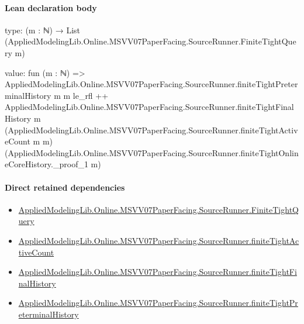 \documentclass[10pt]{article}
\begin{document}
\paragraph{Lean declaration body}
\begin{ReviewVerbatim}
type:
(m : ℕ) → List (AppliedModelingLib.Online.MSVV07PaperFacing.SourceRunner.FiniteTightQuery m)

value:
fun (m : ℕ) =>
  AppliedModelingLib.Online.MSVV07PaperFacing.SourceRunner.finiteTightPreterminalHistory m m le_rfl ++
    AppliedModelingLib.Online.MSVV07PaperFacing.SourceRunner.finiteTightFinalHistory m
      (AppliedModelingLib.Online.MSVV07PaperFacing.SourceRunner.finiteTightActiveCount m m)
      (AppliedModelingLib.Online.MSVV07PaperFacing.SourceRunner.finiteTightOnlineCoreHistory._proof_1 m)
\end{ReviewVerbatim}

\paragraph{Direct retained dependencies}
\begin{itemize}\raggedright
\item \hyperlink{governing-declaration-feae64ffc2ccaca7}{Applied\allowbreak{}Modeling\allowbreak{}Lib.\allowbreak{}Online.\allowbreak{}MSVV07\allowbreak{}Paper\allowbreak{}Facing.\allowbreak{}Source\allowbreak{}Runner.\allowbreak{}Finite\allowbreak{}Tight\allowbreak{}Query}
\item \hyperlink{governing-declaration-a821db3d53d0e450}{Applied\allowbreak{}Modeling\allowbreak{}Lib.\allowbreak{}Online.\allowbreak{}MSVV07\allowbreak{}Paper\allowbreak{}Facing.\allowbreak{}Source\allowbreak{}Runner.\allowbreak{}finite\allowbreak{}Tight\allowbreak{}Active\allowbreak{}Count}
\item \hyperlink{governing-declaration-02de78e700608177}{Applied\allowbreak{}Modeling\allowbreak{}Lib.\allowbreak{}Online.\allowbreak{}MSVV07\allowbreak{}Paper\allowbreak{}Facing.\allowbreak{}Source\allowbreak{}Runner.\allowbreak{}finite\allowbreak{}Tight\allowbreak{}Final\allowbreak{}History}
\item \hyperlink{governing-declaration-56405a0a17c28b90}{Applied\allowbreak{}Modeling\allowbreak{}Lib.\allowbreak{}Online.\allowbreak{}MSVV07\allowbreak{}Paper\allowbreak{}Facing.\allowbreak{}Source\allowbreak{}Runner.\allowbreak{}finite\allowbreak{}Tight\allowbreak{}Preterminal\allowbreak{}History}
\end{itemize}
\hypertarget{governing-declaration-3dcb95825f7face3}{}
\end{document}
